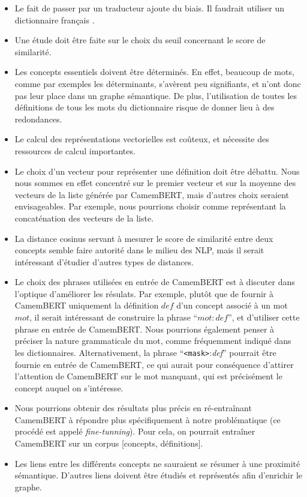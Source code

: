 \documentclass{amsart}
\begin{document}
\begin{itemize}
    \item Le fait de passer par un traducteur ajoute du biais. Il faudrait utiliser un dictionnaire français \cite{sagot2008building, GLAWI}.
    \item Une étude doit être faite sur le choix du seuil concernant le score de similarité.
    \item Les concepts essentiels doivent être déterminés. En effet, beaucoup de mots, comme par exemples les déterminants, s'avèrent peu signifiants, et n'ont donc pas leur place dans un graphe sémantique. De plus, l'utilisation de toutes les définitions de tous les mots du dictionnaire risque de donner lieu à des redondances.
    \item Le calcul des représentations vectorielles est coûteux, et nécessite des ressources de calcul importantes.
    \item Le choix d'un vecteur pour représenter une définition doit être débattu. Nous nous sommes en effet concentré sur le premier vecteur et sur la moyenne des vecteurs de la liste générée par CamemBERT, mais d'autres choix seraient envisageables. Par exemple, nous pourrions choisir comme représentant la concaténation des vecteurs de la liste.
    \item La distance cosinus servant à mesurer le score de similarité entre deux concepts semble faire autorité dans le milieu des NLP, mais il serait intéressant d'étudier d'autres types de distances.
    \item Le choix des phrases utilisées en entrée de CamemBERT est à discuter dans l'optique d'améliorer les résulats. Par exemple, plutôt que de fournir à CamemBERT uniquement la définition $def$ d'un concept associé à un mot $mot$, il serait intéressant de construire la phrase \enquote{$mot:def$}, et d'utiliser cette phrase en entrée de CamemBERT. Nous pourrions également penser à préciser la nature grammaticale du mot, comme fréquemment indiqué dans les dictionnaires. Alternativement, la phrase \enquote{\texttt{<mask>}:\textit{def}} pourrait être fournie en entrée de CamemBERT, ce qui aurait pour conséquence d'attirer l'attention de CamemBERT sur le mot manquant, qui est précisément le concept auquel on s'intéresse.
    \item Nous pourrions obtenir des résultats plus précis en ré-entraînant CamemBERT à répondre plus spécifiquement à notre problématique (ce procédé est appelé \textit{fine-tunning}). Pour cela, on pourrait entraîner CamemBERT sur un corpus [concepts, définitions].
    \item Les liens entre les différents concepts ne sauraient se résumer à une proximité sémantique. D'autres liens doivent être étudiés et représentés afin d'enrichir le graphe.
\end{itemize}
\clearpage

\printbibliography
    
\end{document}
